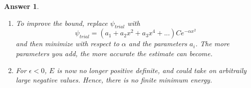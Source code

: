 \documentclass[a4paper]{article}
\newtheorem{ans}{Answer}[section]
\theoremstyle{new}
\begin{document}
\begin{ans}
\begin{enumerate}[label=(\alph*)]
\begin{eqnarray}
\end{eqnarray}
Minimize $E$ with respect to $\alpha$:
$$0=\frac{dE}{d\alpha}=-\frac{1}{2\alpha^2}+\frac{1}{2}-\frac{3}{\alpha^3}\implies\alpha^3-\alpha-6=0$$
which gives $\alpha=2$ and $\alpha=-1\pm\sqrt{2}i$. We reject the complex solution since $\alpha\in\mathbb{R}$, then
$$E[\psi]=\frac{1}{2\times 2}+\frac{1}{2}\times 2+\frac{3}{2}\times\frac{1}{2^2}=\frac{13}{8}$$
\item To improve the bound, replace $\psi_{trial}$ with
$$\psi_{trial}=(a_1+a_2x^2+a_3x^4+...)Ce^{-\alpha x^2}$$
and then minimize with respect to $\alpha$ and the parameters $a_i$. The more parameters you add, the more accurate the estimate can become.
\item For $\epsilon<0$, $E$ is now no longer positive definite, and could take on arbitraily large negative values. Hence, there is no finite minimum energy.
\end{enumerate}
\end{ans}
\newpage
\end{document}
